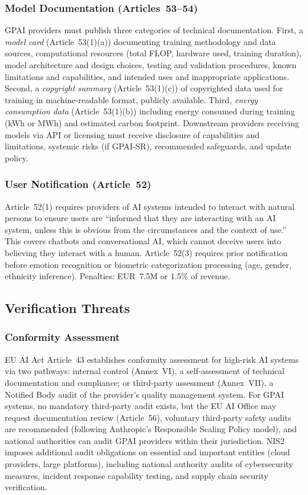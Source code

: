 \documentclass[11pt,a4paper]{article}
\begin{document}
\subsubsection{Model Documentation (Articles~53--54)}

GPAI providers must publish three categories of technical documentation. First, a \emph{model card} (Article~53(1)(a)) documenting training methodology and data sources, computational resources (total FLOP, hardware used, training duration), model architecture and design choices, testing and validation procedures, known limitations and capabilities, and intended uses and inappropriate applications. Second, a \emph{copyright summary} (Article~53(1)(c)) of copyrighted data used for training in machine-readable format, publicly available. Third, \emph{energy consumption data} (Article~53(1)(b)) including energy consumed during training (kWh or MWh) and estimated carbon footprint. Downstream providers receiving models via API or licensing must receive disclosure of capabilities and limitations, systemic risks (if GPAI-SR), recommended safeguards, and update policy.

\subsubsection{User Notification (Article~52)}

Article~52(1) requires providers of AI systems intended to interact with natural persons to ensure users are ``informed that they are interacting with an AI system, unless this is obvious from the circumstances and the context of use.'' This covers chatbots and conversational AI, which cannot deceive users into believing they interact with a human. Article~52(3) requires prior notification before emotion recognition or biometric categorization processing (age, gender, ethnicity inference). Penalties: EUR~7.5M or 1.5\% of revenue.

\subsection{Verification Threats}

\subsubsection{Conformity Assessment}

EU AI Act Article~43 establishes conformity assessment for high-risk AI systems via two pathways: internal control (Annex~VI), a self-assessment of technical documentation and compliance; or third-party assessment (Annex~VII), a Notified Body audit of the provider's quality management system. For GPAI systems, no mandatory third-party audit exists, but the EU AI Office may request documentation review (Article~56), voluntary third-party safety audits are recommended (following Anthropic's Responsible Scaling Policy model), and national authorities can audit GPAI providers within their jurisdiction. NIS2 imposes additional audit obligations on essential and important entities (cloud providers, large platforms), including national authority audits of cybersecurity measures, incident response capability testing, and supply chain security verification.
\end{document}
